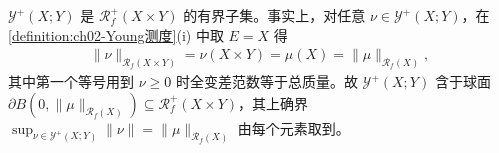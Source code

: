 \documentclass[../../main.tex]{subfiles}%
\begin{document}
\begin{remark}\label{remark:ch02-Young有界}
$\mathcal Y^+(X;Y)$ 是 $\mathscr R^+_f(X\times Y)$ 的有界子集。事实上，对任意 $\nu\in\mathcal Y^+(X;Y)$，在\cref{definition:ch02-Young测度}(i) 中取 $E=X$ 得
\begin{align*}
\|\nu\|_{\mathscr R_f(X\times Y)}=\nu(X\times Y)=\mu(X)=\|\mu\|_{\mathscr R_f(X)},
\end{align*}
其中第一个等号用到 $\nu\geqslant0$ 时全变差范数等于总质量。故 $\mathcal Y^+(X;Y)$ 含于球面 $\partial B(0,\|\mu\|_{\mathscr R_f(X)})\subseteq\mathscr R^+_f(X\times Y)$，其上确界 $\sup_{\nu\in\mathcal Y^+(X;Y)}\|\nu\|=\|\mu\|_{\mathscr R_f(X)}$ 由每个元素取到。
\end{remark}
\end{document}
